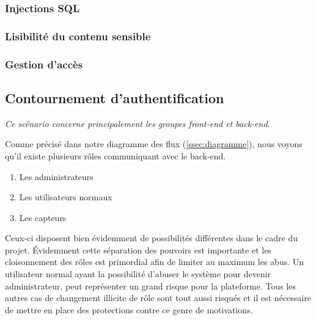 \documentclass[12pt]{article}
\begin{document}
\subsubsection{Injections SQL}

\subsubsection{Lisibilité du contenu sensible}

\subsubsection{Gestion d'accès}


\clearpage
\subsection{Contournement d'authentification}

\emph{Ce scénario concerne principalement les groupes front-end et back-end}.
\medskip

Comme précisé dans notre diagramme des flux (\autoref{ssec:diagramme}), nous voyons qu'il existe plusieurs rôles communiquant avec le back-end.

\begin{enumerate}
\item Les administrateurs
\item Les utilisateurs normaux
\item Les capteurs
\end{enumerate}

Ceux-ci disposent bien évidemment de possibilités différentes dans le cadre du projet. Évidemment cette séparation des pouvoirs est importante et les cloisonnement des rôles est primordial afin de limiter au maximum les abus. Un utilisateur normal ayant la possibilité d'abuser le système pour devenir administrateur, peut représenter un grand risque pour la plateforme. Tous les autres cas de changement illicite de rôle sont tout aussi risqués et il est nécessaire de mettre en place des protections contre ce genre de motivations.
\medskip
\end{document}
